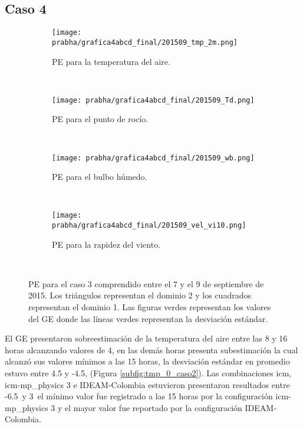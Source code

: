 \subsection{Caso 4}

\begin{figure}[H]
    \centering
    \begin{subfigure}[b]{0.45\textwidth}
        \caption{PE para la temperatura del aire.}
	\texttt{[image: prabha/grafica4abcd\_final/201509\_tmp\_2m.png]}
    \label{subfig:tmp_0_caso4}
	\end{subfigure}
	~
	    \begin{subfigure}[b]{0.45\textwidth}
	        \caption{PE para el punto de rocío.}
	\texttt{[image: prabha/grafica4abcd\_final/201509\_Td.png]}

    \label{subfig:td_caso4}
	\end{subfigure}
	~
	    \begin{subfigure}[b]{0.45\textwidth}
	\caption{PE para el bulbo húmedo.}
	\texttt{[image: prabha/grafica4abcd\_final/201509\_wb.png]}
    \label{subfig:wb_caso4}
	\end{subfigure}
	~
	    \begin{subfigure}[b]{0.45\textwidth}
	\caption{PE para la rapidez del viento.}	
	\texttt{[image: prabha/grafica4abcd\_final/201509\_vel\_vi10.png]}
    
    \label{subfig:vel_caso4}
	\end{subfigure}
	~

\caption{PE para el caso 3 comprendido entre el 7 y el 9 de septiembre de 2015. Los triángulos representan el dominio 2 y los cuadrados representan el dominio 1. Las figuras verdes representan los valores del GE donde las líneas verdes representan la desviación estándar.}	
\label{subfig:mbe_caso4}	
\end{figure}


El GE presentaron sobreestimación de la temperatura del aire entre las 8 y 16 horas alcanzando valores de 4\celc, en las demás horas presenta subestimación la cual alcanzó sus valores mínimos a las 15 horas, la desviación estándar en promedio estuvo entre 4.5 y -4.5\celc, (Figura \ref{subfig:tmp_0_caso2}). Las combinaciones icm, icm-mp\_physics 3 e IDEAM-Colombia estuvieron presentaron resultados entre -6.5\celc\ y 3\celc\, el mínimo valor fue registrado a las 15 horas por la configuración icm-mp\_physics 3 y el mayor valor fue reportado por la configuración IDEAM-Colombia.\\

